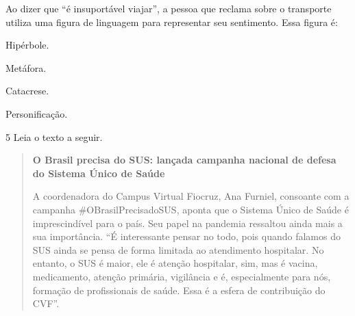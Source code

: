 
\noindent Ao dizer que ``é insuportável viajar'', a pessoa que reclama sobre o
transporte utiliza uma figura de linguagem para representar seu
sentimento. Essa figura é:

\begin{escolha}
\item Hipérbole.
\item Metáfora.
\item Catacrese.
\item Personificação.
\end{escolha}



\num{5} Leia o texto a seguir.

\begin{quote}
\centering\noindent \textbf{O Brasil precisa do SUS: lançada campanha nacional de defesa do
Sistema Único de Saúde}\\
\medskip


\noindent A coordenadora do Campus Virtual Fiocruz, Ana Furniel, consoante com a
campanha \#OBrasilPrecisadoSUS, aponta que o Sistema Único de Saúde é
imprescindível para o país. Seu papel na pandemia ressaltou ainda mais a
sua importância. ``É interessante pensar no todo, pois quando falamos do
SUS ainda se pensa de forma limitada ao atendimento hospitalar. No
entanto, o SUS é maior, ele é atenção hospitalar, sim, mas é vacina,
medicamento, atenção primária, vigilância e é, especialmente para nós,
formação de profissionais de saúde. Essa é a esfera de contribuição do
CVF''.

\end{quote}

